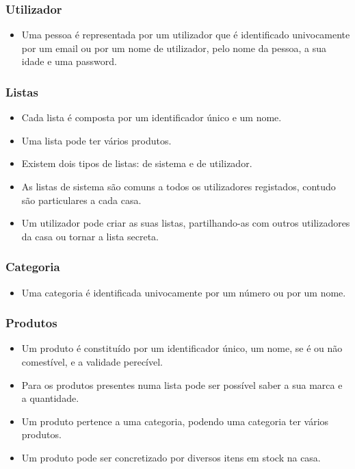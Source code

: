 \subsubsection{Utilizador}
\begin{itemize}
	\item Uma pessoa é representada por um utilizador que é identificado univocamente por um email ou por um nome de utilizador, pelo nome da pessoa, a sua idade e uma password.
\end{itemize}

\subsubsection{Listas}
\begin{itemize}
	\item Cada lista é composta por um identificador único e um nome.
	\item Uma lista pode ter vários produtos.
	\item Existem dois tipos de listas: de sistema e de utilizador. 
	\item As listas de sistema são comuns a todos os utilizadores registados, contudo são particulares a cada casa. 
	\item Um utilizador pode criar as suas listas, partilhando-as com outros utilizadores da casa ou tornar a lista secreta.
\end{itemize}

\subsubsection{Categoria}
\begin{itemize}
	\item Uma categoria é identificada univocamente por um número ou por um nome.
\end{itemize}


\subsubsection{Produtos}
\begin{itemize}
	\item Um produto é constituído por um identificador único, um nome, se é ou não comestível, e a validade perecível.
	\item Para os produtos presentes numa lista pode ser possível saber a sua marca e a quantidade.
	\item Um produto pertence a uma categoria, podendo uma categoria ter vários produtos.
	\item Um produto pode ser concretizado por diversos itens em stock na casa.
\end{itemize}
 
